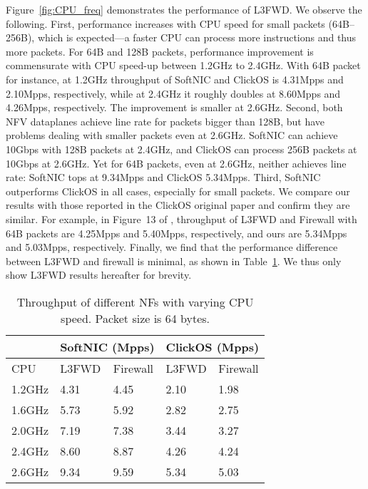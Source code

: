 Figure~\ref{fig:CPU_freq} demonstrates the performance of L3FWD. We observe the following. 
First, performance increases with CPU speed for small packets (64B--256B), which is expected---a faster CPU can process more instructions and thus more packets. For 64B and 128B packets, performance improvement is commensurate with CPU speed-up between 1.2GHz to 2.4GHz. With 64B packet for instance, at 1.2GHz throughput of SoftNIC and ClickOS is 4.31Mpps and 2.10Mpps, respectively, while at 2.4GHz it roughly doubles at 8.60Mpps and 4.26Mpps, respectively. The improvement is smaller at 2.6GHz.
Second, both NFV dataplanes achieve line rate for packets bigger than 128B, but have problems dealing with smaller packets even at 2.6GHz.
SoftNIC can achieve 10Gbps with 128B packets at 2.4GHz, and ClickOS can process 256B packets at 10Gbps at 2.6GHz. Yet for 64B packets, even at 2.6GHz, neither achieves line rate: SoftNIC tops at 9.34Mpps and ClickOS 5.34Mpps. 
Third, SoftNIC outperforms ClickOS in all cases, especially for small packets. We compare our results with those reported in the ClickOS original paper \cite{MARO14} and confirm they are similar. For example, in Figure~13 of \cite{MARO14}, throughput of L3FWD and Firewall with 64B packets are 4.25Mpps and 5.40Mpps, respectively, and ours are 5.34Mpps and 5.03Mpps, respectively.
Finally, we find that the performance difference between L3FWD and firewall is minimal, as shown in Table~\ref{table:rst_3NF}. We thus only show L3FWD results hereafter for brevity. 

\begin{table}[ht]
\vspace{-1mm}
\centering
\caption{Throughput of different NFs with varying CPU speed. Packet size is 64 bytes. }
\label{table:rst_3NF}
\small
\begin{tabular}{|l|l|l|l|l|}
\hline
          & \multicolumn{2}{l|}{SoftNIC (Mpps)} & \multicolumn{2}{l|}{ClickOS (Mpps)} \\ \hline
CPU     & L3FWD     & Firewall      & L3FWD     & Firewall    \\ \hline
1.2GHz       & 4.31     & 4.45            & 2.10    & 1.98       \\ \hline
1.6GHz      & 5.73    & 5.92           & 2.82     & 2.75       \\ \hline
2.0GHz        & 7.19     & 7.38          & 3.44     & 3.27       \\ \hline
2.4GHz       & 8.60     & 8.87            & 4.26     & 4.24       \\ \hline
2.6GHz      & 9.34     & 9.59           & 5.34     & 5.03       \\ \hline
\end{tabular}
\vspace{-2mm}
\end{table}


